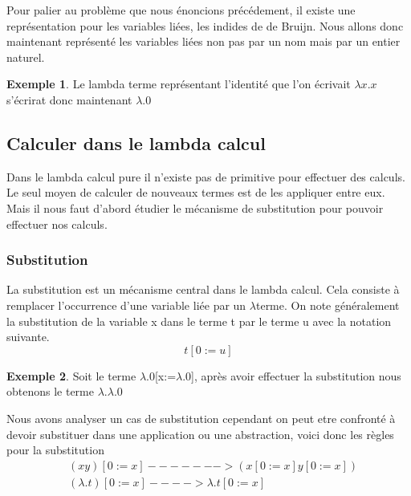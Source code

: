 \documentclass {article}
\theoremstyle{definition}
\newtheorem{example}{Exemple}
\theoremstyle{remark}
\begin{document}
Pour palier au problème que nous énoncions précédement, il existe une 
représentation pour les variables liées, les indides de de Bruijn.
Nous allons donc maintenant représenté les variables liées non pas par un 
nom mais par un entier naturel. 
\begin{example}
  Le lambda terme représentant l'identité que l'on écrivait \(\lambda x.x\) s'écrirat donc maintenant \(\lambda.0\)
\end{example}

  
\subsection{Calculer dans le lambda calcul}

Dans le lambda calcul pure il n'existe pas de primitive pour effectuer des 
calculs. Le seul moyen de calculer de nouveaux termes est de les appliquer 
entre eux. Mais il nous faut d'abord étudier le mécanisme de substitution pour 
pouvoir effectuer nos calculs.

\subsubsection{Substitution}

La substitution est un mécanisme central dans le lambda calcul. Cela consiste 
à remplacer l'occurrence d'une variable liée par un \(\lambda\)terme.
On note généralement la substitution de la variable x dans le terme t par le 
terme u avec la notation suivante. 
\[ 
t[0:=u]
\]

\begin{example}
  Soit le terme \(\lambda\).0[x:=\(\lambda\).0], après avoir effectuer la
  substitution nous obtenons le terme \(\lambda\).\(\lambda\).0
\end{example}

Nous avons analyser un cas de substitution cependant on peut etre confronté 
à devoir substituer dans une application ou une abstraction, voici donc 
les règles pour la substitution 
\begin{align*}
&(x y)[0 := x] ------->(x[0 := x] y[0 := x]) \\
&(\lambda .t)[0 := x]---->\lambda .t[0 := x] \\
\end{align*}
\end{document}
